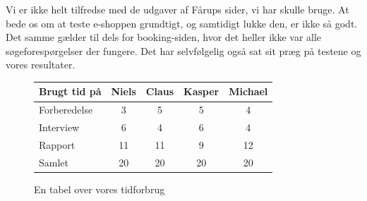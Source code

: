 \documentclass[10pt,a4paper]{article}      %
\begin{document}
Vi er ikke helt tilfredse med de udgaver af Fårups sider, vi har skulle bruge. At bede os om at teste e-shoppen grundtigt, og samtidigt lukke den, er ikke så godt. Det samme gælder til dels for booking-siden, hvor det heller ikke var alle søgeforespørgelser der fungere. Det har selvfølgelig også sat sit præg på testene og vores resultater.

\begin{figure}[htbp]
  \centering
  \begin{tabular}{lcccc}
    \toprule
    \textbf{Brugt tid på} & {Niels} & {Claus}  & {Kasper}  & {Michael} \\
    \midrule
    Forberedelse & 3  & 5  & 5 & 4   \\
    Interview    & 6  & 4  & 6 & 4   \\
    Rapport      & 11 & 11 & 9 & 12  \\
    \midrule
    Samlet & 20 & 20 & 20 & 20 \\
    \bottomrule
  \end{tabular}
  \caption{En tabel over vores tidforbrug}
  \label{tab:tidsforbrug}
\end{figure}
\end{document}
